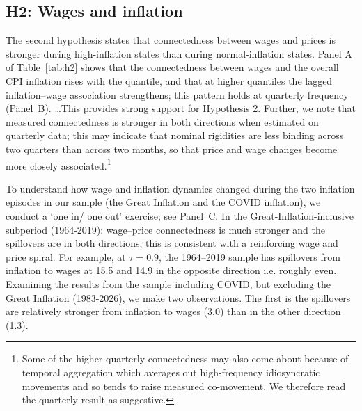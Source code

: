\documentclass{article}
\begin{document}
\subsection{H2: Wages and inflation}
The second hypothesis states that  connectedness between wages and prices is stronger during
high-inflation states than during normal-inflation states. Panel A of Table~\ref{tab:h2} shows that the connectedness between wages and the overall CPI inflation
rises with the quantile, and that at higher quantiles the lagged inflation--wage association
strengthens; this pattern holds at quarterly frequency (Panel~B). …This provides strong support for Hypothesis 2. Further, we note that measured connectedness is stronger in both directions when estimated on quarterly data; this may indicate that nominal rigidities are less binding across two quarters than across two months, so that price and wage changes become more closely associated.\footnote{Some of the higher quarterly connectedness may also come about because of temporal aggregation which averages out high-frequency idiosyncratic movements and so tends to raise measured co-movement. We therefore read the quarterly result as suggestive.}



To understand how wage and inflation dynamics changed during the two inflation episodes in our sample (the Great Inflation and the COVID inflation), we conduct a `one in/ one out' exercise; see Panel~C.     In the
Great-Inflation-inclusive subperiod (1964-2019): wage--price connectedness is much stronger and the spillovers are in both directions; this is consistent with a reinforcing wage and price spiral.  For example, at $\tau=0.9$, the 1964–2019 sample has spillovers from inflation to wages at 15.5 and 14.9 in the opposite direction i.e. roughly even.  Examining the results from the sample including COVID, but excluding the Great Inflation (1983-2026), we make two observations. The first is the spillovers are relatively stronger from inflation to wages (3.0) than in the other direction (1.3). 
\end{document}
